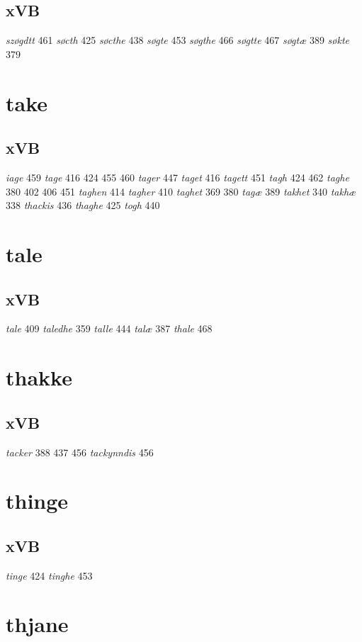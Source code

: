\documentclass[a4paper,twocolumn]{article}
\begin{document}
\subsection{xVB}
\label{sec:org1d86d11}
\emph{szøgdtt} 461 \emph{søcth} 425 \emph{søcthe} 438 \emph{søgte} 453 \emph{søgthe} 466 \emph{søgtte} 467 \emph{søgtæ} 389 \emph{søkte} 379 
\section{take}
\label{sec:orgedb29fd}
\subsection{xVB}
\label{sec:org493d4b4}
\emph{iage} 459 \emph{tage} 416 424 455 460 \emph{tager} 447 \emph{taget} 416 \emph{tagett} 451 \emph{tagh} 424 462 \emph{taghe} 380 402 406 451 \emph{taghen} 414 \emph{tagher} 410 \emph{taghet} 369 380 \emph{tagæ} 389 \emph{takhet} 340 \emph{takhæ} 338 \emph{thackis} 436 \emph{thaghe} 425 \emph{togh} 440 
\section{tale}
\label{sec:org2e041e2}
\subsection{xVB}
\label{sec:org7eeb701}
\emph{tale} 409 \emph{taledhe} 359 \emph{talle} 444 \emph{talæ} 387 \emph{thale} 468 
\section{thakke}
\label{sec:org335226a}
\subsection{xVB}
\label{sec:org2ab906e}
\emph{tacker} 388 437 456 \emph{tackynndis} 456 
\section{thinge}
\label{sec:org854dcf7}
\subsection{xVB}
\label{sec:org7df18eb}
\emph{tinge} 424 \emph{tinghe} 453 
\section{thjane}
\label{sec:orgf7fac8b}
\end{document}
